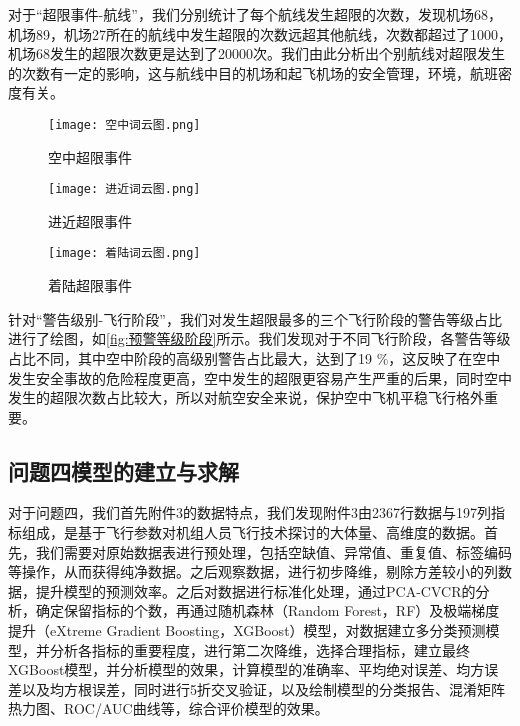 \documentclass{MathorCupModeling}
\begin{document}
	对于“超限事件-航线”，我们分别统计了每个航线发生超限的次数，发现机场68，机场89，机场27所在的航线中发生超限的次数远超其他航线，次数都超过了1000，机场68发生的超限次数更是达到了20000次。我们由此分析出个别航线对超限发生的次数有一定的影响，这与航线中目的机场和起飞机场的安全管理，环境，航班密度有关。
	\begin{figure}[H]
		\centering
		\begin{minipage}{0.30\linewidth}
			\centering
			\texttt{[image: 空中词云图.png]}
			\caption{空中超限事件}
			\label{fig:空中词云图}
		\end{minipage}
		\begin{minipage}{0.30\linewidth}
			\centering
			\texttt{[image: 进近词云图.png]}
			\caption{进近超限事件}
			\label{fig:进近词云图}
		\end{minipage}
		\begin{minipage}{0.30\linewidth}
			\centering
			\texttt{[image: 着陆词云图.png]}
			\caption{着陆超限事件}
			\label{fig:着陆词云图}
		\end{minipage}
	\end{figure}
	针对“警告级别-飞行阶段”，我们对发生超限最多的三个飞行阶段的警告等级占比进行了绘图，如\textcolor{blue}{\cref{fig:预警等级阶段}}所示。我们发现对于不同飞行阶段，各警告等级占比不同，其中空中阶段的高级别警告占比最大，达到了19 \%，这反映了在空中发生安全事故的危险程度更高，空中发生的超限更容易产生严重的后果，同时空中发生的超限次数占比较大，所以对航空安全来说，保护空中飞机平稳飞行格外重要。

	\subsection{问题四模型的建立与求解}
	对于问题四，我们首先附件3的数据特点，我们发现附件3由2367行数据与197列指标组成，是基于飞行参数对机组人员飞行技术探讨的大体量、高维度的数据。首先，我们需要对原始数据表进行预处理，包括空缺值、异常值、重复值、标签编码等操作，从而获得纯净数据。之后观察数据，进行初步降维，剔除方差较小的列数据，提升模型的预测效率。之后对数据进行标准化处理，通过PCA-CVCR的分析，确定保留指标的个数，再通过随机森林（Random Forest，RF）及极端梯度提升（eXtreme Gradient Boosting，XGBoost）模型，对数据建立多分类预测模型，并分析各指标的重要程度，进行第二次降维，选择合理指标，建立最终XGBoost模型，并分析模型的效果，计算模型的准确率、平均绝对误差、均方误差以及均方根误差，同时进行5折交叉验证，以及绘制模型的分类报告、混淆矩阵热力图、ROC/AUC曲线等，综合评价模型的效果。
\end{document}
